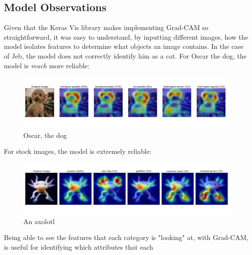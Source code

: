 \documentclass{article}
\begin{document}
\subsection{Model Observations}
\par Given that the Keras Vis library makes implementing Grad-CAM so straightforward, it was easy to understand, by inputting different images, how the model isolates features to determine what objects an image contains.
In the case of Jeb, the model does not correctly identify him as a cat.
For Oscar the dog, the model is \textit{much} more reliable:

\begin{figure}[H]
    \centering
    \includegraphics[width=6in]{csci-8110/hw-2/images/oscar_output.png}
    \caption{Oscar, the dog}
    \label{fig:oscar}
\end{figure}

\par For stock images, the model is extremely reliable:

\begin{figure}[H]
    \centering
    \includegraphics[width=6in]{csci-8110/hw-2/images/axolotl_output.png}
    \caption{An axolotl}
    \label{fig:axolotl}
\end{figure}

\par Being able to see the features that each category is "looking" at, with Grad-CAM, is useful for identifying which attributes that each
\end{document}
